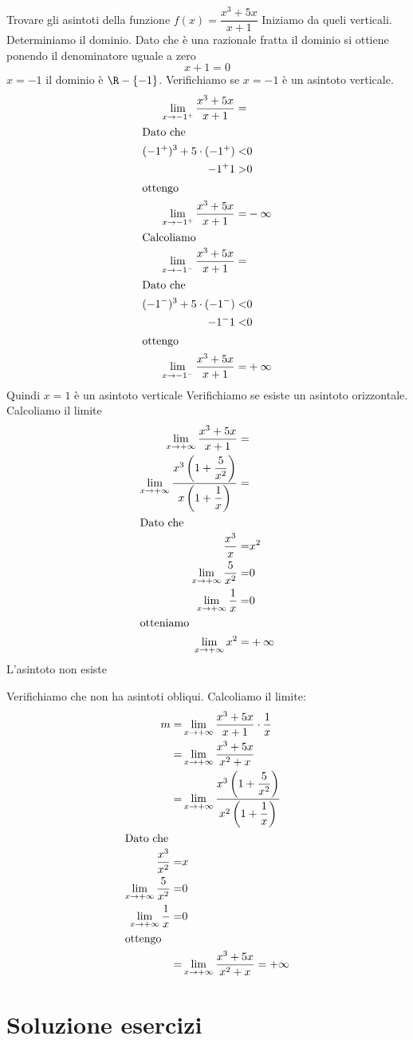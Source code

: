 \begin{exercise}
	Trovare gli asintoti della funzione $f(x)=\dfrac{x^3+5x}{x+1}$
	\tcblower
	Iniziamo da queli verticali. Determiniamo il dominio. Dato che è una razionale fratta il dominio si ottiene ponendo il denominatore uguale a zero\[x+1=0\] $x=-1$ il dominio è $\R-\lbrace-1\rbrace$. Verifichiamo se $x=-1$ è un asintoto verticale.
	\begin{align*}
	\lim_{x\to -1^+}\dfrac{x^3+5x}{x+1}=&\\
	\intertext{Dato che}
	(-1^+)^3+5\cdot(-1^+)<&0\\
	-1^+1>&0\\
	\intertext{ottengo}
	\lim_{x\to -1^+}\dfrac{x^3+5x}{x+1}=&-\infty\\
	\intertext{Calcoliamo}
	\lim_{x\to -1^-}\dfrac{x^3+5x}{x+1}=&\\
	\intertext{Dato che}
	(-1^-)^3+5\cdot(-1^-)<&0\\
-1^-1<&0\\
	\intertext{ottengo}
	\lim_{x\to -1^-}\dfrac{x^3+5x}{x+1}=&+\infty\\
	\end{align*}
	Quindi $x=1$ è un asintoto verticale
	Verifichiamo se esiste un asintoto orizzontale. Calcoliamo il limite
	\begin{align*}
	\lim_{x\to +\infty}\dfrac{x^3+5x}{x+1}=&\\
	\lim_{x\to +\infty}\dfrac{x^3\left(1+\dfrac{5}{x^2}\right)}{x\left(1+\dfrac{1}{x}\right)}=&\\
	\intertext{Dato che}
	\dfrac{x^3}{x}=&x^2\\
	\lim_{x\to +\infty}\dfrac{5}{x^2}=&0\\
	\lim_{x\to +\infty}\dfrac{1}{x}=&0\\
	\intertext{otteniamo}
	\lim_{x\to +\infty}x^2=&+\infty\\
	\end{align*}
	L'asintoto non esiste
	
	Verifichiamo che non ha asintoti obliqui. Calcoliamo il  limite:
	\begin{align*}
	m=&\lim_{x\to +\infty}\dfrac{x^3+5x}{x+1}\cdot\dfrac{1}{x}\\
	=&\lim_{x\to +\infty}\dfrac{x^3+5x}{x^2+x}\\
	=&\lim_{x\to +\infty}\dfrac{x^3\left(1+\dfrac{5}{x^2}\right)}{x^2\left(1+\dfrac{1}{x}\right)}\\
	\intertext{Dato che}
	\dfrac{x^3}{x^2}=&x\\
	\lim_{x\to +\infty}\dfrac{5}{x^2}=&0\\
	\lim_{x\to +\infty}\dfrac{1}{x}=&0\\
	\intertext{ottengo}
	=&\lim_{x\to +\infty}\dfrac{x^3+5x}{x^2+x}=+\infty
	\end{align*}
\end{exercise}
\tcbstoprecording
\newpage
\section{Soluzione esercizi}
\tcbinputrecords
